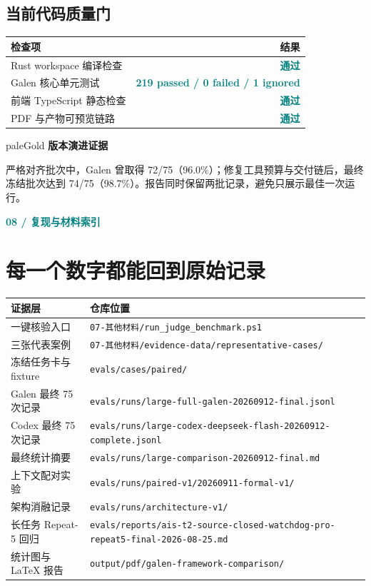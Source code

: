\documentclass[UTF8,11pt,a4paper]{ctexart}
\newcommand{\kicker}[1]{\textcolor{teal}{\sffamily\bfseries\small #1}\par\vspace{1mm}}
\newcommand{\statusok}{\textcolor{teal}{\bfseries 通过}}
\newcommand{\code}[1]{\texttt{\small #1}}
\begin{document}
\subsection*{当前代码质量门}
\begin{tabularx}{\textwidth}{@{}Y r@{}}
\toprule
\textbf{检查项} & \textbf{结果}\\
\midrule
Rust workspace 编译检查 & \statusok\\
Galen 核心单元测试 & \textcolor{teal}{\bfseries 219 passed / 0 failed / 1 ignored}\\
前端 TypeScript 静态检查 & \statusok\\
PDF 与产物可预览链路 & \statusok\\
\bottomrule
\end{tabularx}
\begin{card}{paleGold}
\textbf{版本演进证据}\par
严格对齐批次中，Galen 曾取得 72/75（96.0\%）；修复工具预算与交付链后，最终冻结批次达到 74/75（98.7\%）。报告同时保留两批记录，避免只展示最佳一次运行。
\end{card}
\clearpage

\kicker{08  /  复现与材料索引}
\section*{每一个数字都能回到原始记录}
\begin{tabularx}{\textwidth}{@{}p{39mm}Y@{}}
\toprule
\textbf{证据层} & \textbf{仓库位置}\\
\midrule
一键核验入口 & \code{07-其他材料/run\_judge\_benchmark.ps1}\\
三张代表案例 & \code{07-其他材料/evidence-data/representative-cases/}\\
冻结任务卡与 fixture & \code{evals/cases/paired/}\\
Galen 最终 75 次记录 & \code{evals/runs/large-full-galen-20260912-final.jsonl}\\
Codex 最终 75 次记录 & \code{evals/runs/large-codex-deepseek-flash-20260912-complete.jsonl}\\
最终统计摘要 & \code{evals/runs/large-comparison-20260912-final.md}\\
上下文配对实验 & \code{evals/runs/paired-v1/20260911-formal-v1/}\\
架构消融记录 & \code{evals/runs/architecture-v1/}\\
长任务 Repeat-5 回归 & \code{evals/reports/}\newline\code{ais-t2-source-closed-watchdog-pro-repeat5-final-2026-08-25.md}\\
统计图与 LaTeX 报告 & \code{output/pdf/galen-framework-comparison/}\\
\bottomrule
\end{tabularx}
\end{document}
